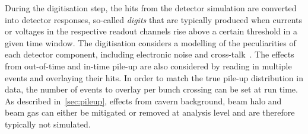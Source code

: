 During the digitisation step, the hits from the detector simulation are converted into detector responses, so-called \textit{digits} that are typically produced when currents or voltages in the respective readout channels rise above a certain threshold in a given time window. The digitisation considers a modelling of the peculiarities of each detector component, including electronic noise and cross-talk~\cite{Aad:2010ah}. The effects from out-of-time and in-time pile-up are also considered by reading in multiple events and overlaying their hits. In order to match the true pile-up distribution in data, the number of events to overlay per bunch crossing can be set at run time. As described in~\cref{sec:pileup}, effects from cavern background, beam halo and beam gas can either be mitigated or removed at analysis level and are therefore typically not simulated. 

%






























 